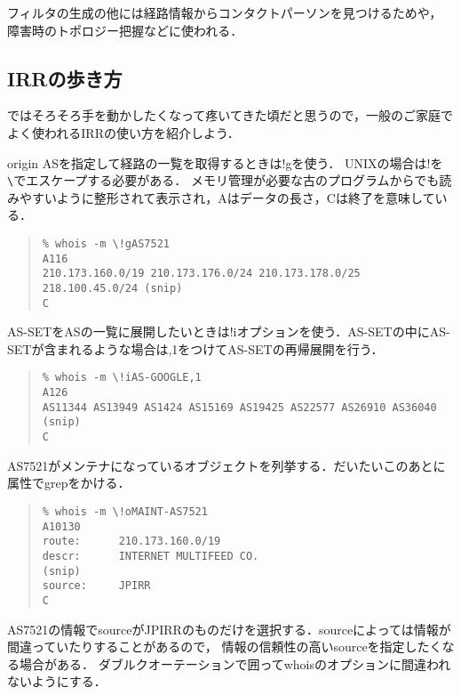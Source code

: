 フィルタの生成の他には経路情報からコンタクトパーソンを見つけるためや，
障害時のトポロジー把握などに使われる．

\subsection{IRRの歩き方}

ではそろそろ手を動かしたくなって疼いてきた頃だと思うので，一般のご家庭でよく使われるIRRの使い方を紹介しよう．

origin ASを指定して経路の一覧を取得するときは!gを使う．
UNIXの場合は!を\verb+\+でエスケープする必要がある．
メモリ管理が必要な古のプログラムからでも読みやすいように整形されて表示され，Aはデータの長さ，Cは終了を意味している．

\begin{quote}
\begin{minilinespace}
\begin{verbatim}
% whois -m \!gAS7521
A116
210.173.160.0/19 210.173.176.0/24 210.173.178.0/25 218.100.45.0/24 (snip)
C
\end{verbatim}
\end{minilinespace}
\end{quote}

AS-SETをASの一覧に展開したいときは!iオプションを使う．AS-SETの中にAS-SETが含まれるような場合は,1をつけてAS-SETの再帰展開を行う．

\begin{quote}
\begin{minilinespace}
\begin{verbatim}
% whois -m \!iAS-GOOGLE,1 
A126
AS11344 AS13949 AS1424 AS15169 AS19425 AS22577 AS26910 AS36040 (snip)
C
\end{verbatim}
\end{minilinespace}
\end{quote}

AS7521がメンテナになっているオブジェクトを列挙する．だいたいこのあとに属性でgrepをかける．

\begin{quote}
\begin{minilinespace}
\begin{verbatim}
% whois -m \!oMAINT-AS7521 
A10130
route:      210.173.160.0/19
descr:      INTERNET MULTIFEED CO.
(snip)
source:     JPIRR
C
\end{verbatim}
\end{minilinespace}
\end{quote}

AS7521の情報でsourceがJPIRRのものだけを選択する．sourceによっては情報が間違っていたりすることがあるので，
情報の信頼性の高いsourceを指定したくなる場合がある．
ダブルクオーテーションで囲ってwhoisのオプションに間違われないようにする．

